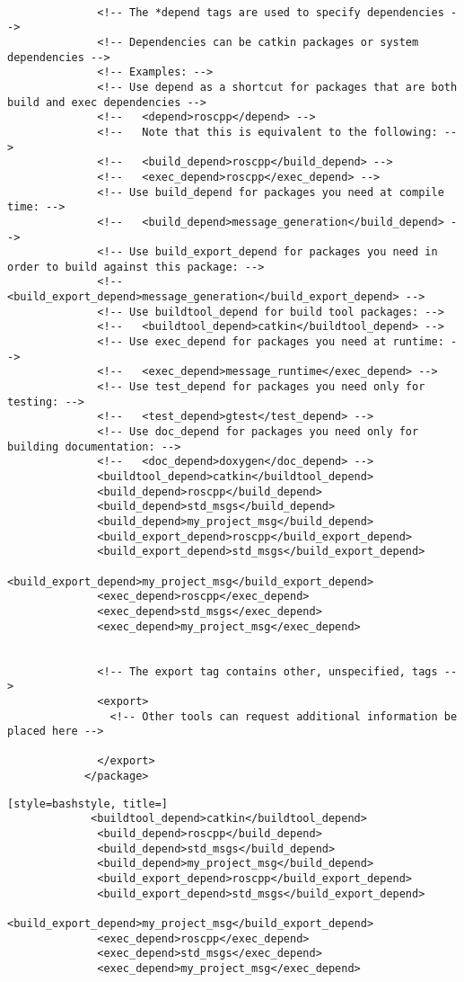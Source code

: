 \documentclass[letterpaper]{article}
\begin{document}
\begin{itemize}
\begin{lstlisting}[style=bashstyle, title=src/nome_project/package.xml]
            
              <!-- The *depend tags are used to specify dependencies -->
              <!-- Dependencies can be catkin packages or system dependencies -->
              <!-- Examples: -->
              <!-- Use depend as a shortcut for packages that are both build and exec dependencies -->
              <!--   <depend>roscpp</depend> -->
              <!--   Note that this is equivalent to the following: -->
              <!--   <build_depend>roscpp</build_depend> -->
              <!--   <exec_depend>roscpp</exec_depend> -->
              <!-- Use build_depend for packages you need at compile time: -->
              <!--   <build_depend>message_generation</build_depend> -->
              <!-- Use build_export_depend for packages you need in order to build against this package: -->
              <!--   <build_export_depend>message_generation</build_export_depend> -->
              <!-- Use buildtool_depend for build tool packages: -->
              <!--   <buildtool_depend>catkin</buildtool_depend> -->
              <!-- Use exec_depend for packages you need at runtime: -->
              <!--   <exec_depend>message_runtime</exec_depend> -->
              <!-- Use test_depend for packages you need only for testing: -->
              <!--   <test_depend>gtest</test_depend> -->
              <!-- Use doc_depend for packages you need only for building documentation: -->
              <!--   <doc_depend>doxygen</doc_depend> -->
              <buildtool_depend>catkin</buildtool_depend>
              <build_depend>roscpp</build_depend>
              <build_depend>std_msgs</build_depend>
              <build_depend>my_project_msg</build_depend>
              <build_export_depend>roscpp</build_export_depend>
              <build_export_depend>std_msgs</build_export_depend>
              <build_export_depend>my_project_msg</build_export_depend>
              <exec_depend>roscpp</exec_depend>
              <exec_depend>std_msgs</exec_depend>
              <exec_depend>my_project_msg</exec_depend>
            
            
              <!-- The export tag contains other, unspecified, tags -->
              <export>
                <!-- Other tools can request additional information be placed here -->
            
              </export>
            </package>

        \end{lstlisting}

        \begin{lstlisting}[style=bashstyle, title=] 
             <buildtool_depend>catkin</buildtool_depend>
              <build_depend>roscpp</build_depend>
              <build_depend>std_msgs</build_depend>
              <build_depend>my_project_msg</build_depend>
              <build_export_depend>roscpp</build_export_depend>
              <build_export_depend>std_msgs</build_export_depend>
              <build_export_depend>my_project_msg</build_export_depend>
              <exec_depend>roscpp</exec_depend>
              <exec_depend>std_msgs</exec_depend>
              <exec_depend>my_project_msg</exec_depend>


\end{lstlisting}
\end{itemize}
\end{document}
